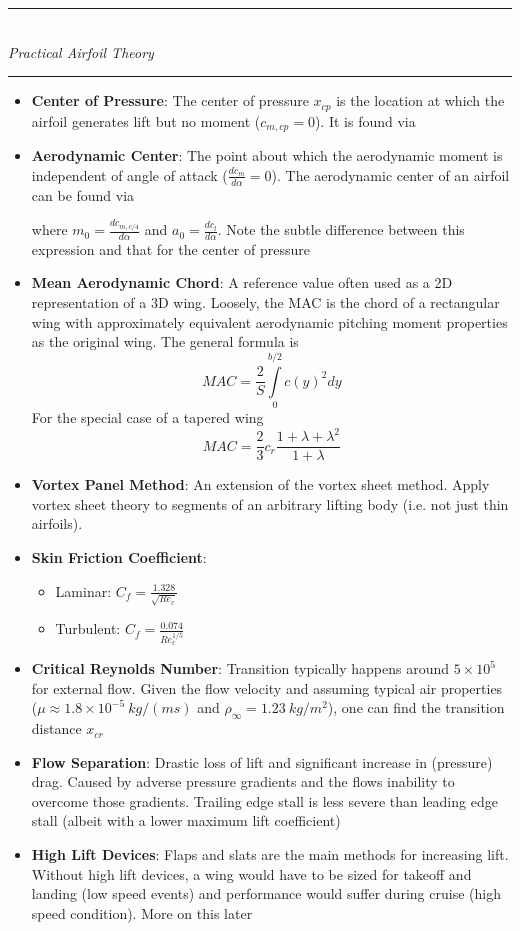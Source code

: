 \documentclass[11pt]{article}
\newcommand{\Item}[1]{\item \textbf{#1}:}
\newcommand{\Header}[1]{\noindent\rule{\textwidth}{0.4pt}\\[0.3cm]\indent \large{\textit{#1}}\normalsize{}\\[-0.1cm]\noindent\rule{\textwidth}{0.4pt}}
\newcommand{\CenteredBoxed}[1]{\begin{center}\boxed{#1}\end{center}}
\newcommand{\intlim}[2]{\int\limits_{#1}^{#2}}
\newcommand{\rhoinfty}{\rho_\infty}
\begin{document}
\Header{Practical Airfoil Theory}
\begin{itemize}
\Item{Center of Pressure} The center of pressure $x_{cp}$ is the location at which the airfoil generates lift but no moment ($c_{m,cp}=0$). It is found via
\CenteredBoxed{x_{cp}=\frac{c}{4}-\frac{M'_{c/4}}{L'}=c\left(\frac{1}{4}-\frac{c_{m,c/4}}{c_l}\right)}
\Item{Aerodynamic Center} The point about which the aerodynamic moment is independent of angle of attack ($\frac{dc_m}{d\alpha}=0$). The aerodynamic center of an airfoil can be found via
\CenteredBoxed{\bar{x}_{ac}=0.25-\frac{m_0}{a_0}}
where $m_0=\frac{dc_{m,c/4}}{d\alpha}$ and $a_0=\frac{dc_l}{d\alpha}$. Note the subtle difference between this expression and that for the center of pressure
\Item{Mean Aerodynamic Chord} A reference value often used as a 2D representation of a 3D wing. Loosely, the MAC is the chord of a rectangular wing with approximately equivalent aerodynamic pitching moment properties as the original wing. The general formula is
$$MAC =\frac{2}{S}\intlim{0}{b/2}c(y)^2dy$$
For the special case of a tapered wing
$$MAC = \frac{2}{3}c_r\frac{1+\lambda+\lambda^2}{1+\lambda}$$
\Item{Vortex Panel Method} An extension of the vortex sheet method. Apply vortex sheet theory to segments of an arbitrary lifting body (i.e. not just thin airfoils).
\Item{Skin Friction Coefficient} 
	\begin{itemize}
	\item Laminar: $C_f=\frac{1.328}{\sqrt{Re_c}}$
	\item Turbulent: $C_f=\frac{0.074}{Re_c^{1/5}}$
	\end{itemize}
\Item{Critical Reynolds Number} Transition typically happens around $5\times10^5$ for external flow. Given the flow velocity and assuming typical air properties ($\mu\approx1.8\times10^{-5}\ kg/(ms)$ and $\rhoinfty=1.23\ kg/m^2$), one can find the transition distance $x_{cr}$
\Item{Flow Separation} Drastic loss of lift and significant increase in (pressure) drag. Caused by adverse pressure gradients and the flows inability to overcome those gradients. Trailing edge stall is less severe than leading edge stall (albeit with a lower maximum lift coefficient)
\Item{High Lift Devices} Flaps and slats are the main methods for increasing lift. Without high lift devices, a wing would have to be sized for takeoff and landing (low speed events) and performance would suffer during cruise (high speed condition). More on this later
\end{itemize}
\end{document}
